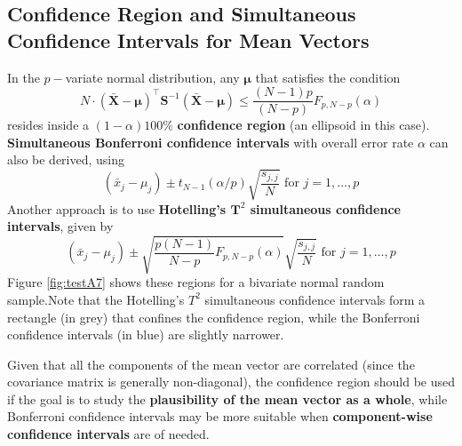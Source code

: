 \subsection[Confidence Region and Simultaneous Confidence Intervals]{Confidence Region and Simultaneous Confidence Intervals for Mean Vectors}
In the $p-$variate normal distribution, any $\bm{\mu}$ that satisfies the condition
$$
    N\cdot (\bm{\bar{X}}-\bm{\mu})^{\!\top}\bm{S}^{-1}(\bm{\bar{X}}-\bm{\mu}) \leq \frac{(N-1)p}{(N-p)}F_{p, N-p}(\alpha)
$$
resides inside a $(1-\alpha)100\%$ \textbf{confidence region} (an ellipsoid in this case). \newl \textbf{Simultaneous Bonferroni confidence intervals} with overall error rate $\alpha$ can also be derived, using 
$$
    (\bar{x}_{j}-\mu_{j})\pm t_{N-1}(\alpha/p)\sqrt{\frac{s_{j,j}}{N}} \text{ for $j=1,\ldots, p$}
$$
Another approach is to use \textbf{Hotelling's $\bm{T}^2$ simultaneous confidence intervals}, given by 
$$
    (\bar{x}_{j}-\mu_{j})\pm \sqrt{\frac{p(N-1)}{N-p}F_{p,N-p}(\alpha)} \sqrt{\frac{s_{j,j}}{N}} \text{ for $j=1,\ldots, p$}
$$
Figure \ref{fig:testA7} shows these regions for a bivariate normal random sample.\newl Note   that the Hotelling's ${T}^{2}$ simultaneous confidence intervals form a rectangle (in grey) that confines the confidence region, while the Bonferroni confidence intervals (in blue) are slightly narrower. \par Given that all the components of the mean vector are correlated (since the covariance matrix is generally non-diagonal), the confidence region should be used if the goal is to study the \textbf{plausibility of the mean vector as a whole}, while Bonferroni confidence intervals may be more suitable when \textbf{component-wise confidence intervals} are of needed. 




